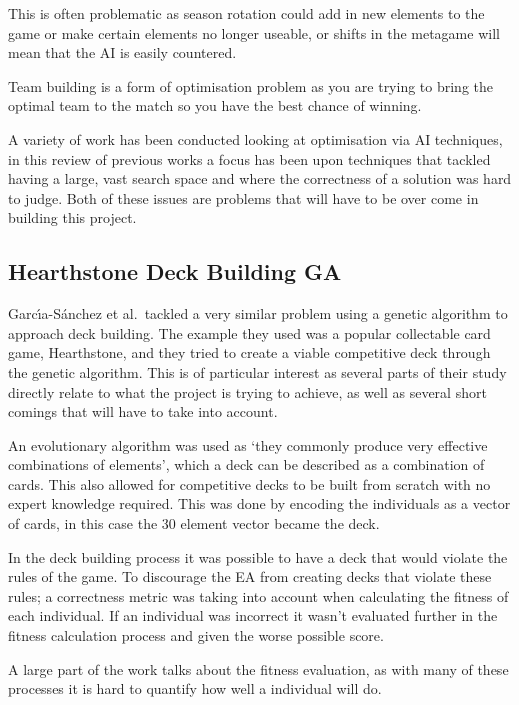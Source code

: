 \documentclass[a4paper]{article}
\begin{document}
This is often problematic as season rotation could add in new elements to the game or make certain elements no longer useable, or shifts in the metagame will mean that the AI is easily countered.
\par
Team building is a form of optimisation problem as you are trying to bring the optimal team to the match so you have the best chance of winning.
\par
A variety of work has been conducted looking at optimisation via AI techniques, in this review of previous works a focus has been upon techniques that tackled having a large, vast search space and where the correctness of a solution was hard to judge.
Both of these issues are problems that will have to be over come in building this project.
\subsection{Hearthstone Deck Building GA}
\par
Garc{\'\i}a-S{\'a}nchez et al.\ tackled a very similar problem using a genetic algorithm to approach deck building\cite{hearthstoneAI}.
The example they used was a popular collectable card game, Hearthstone, and they tried to create a viable competitive deck through the genetic algorithm.
This is of particular interest as several parts of their study directly relate to what the project is trying to achieve, as well as several short comings that will have to take into account.
\par
An evolutionary algorithm was used as `they commonly produce very effective combinations of elements'\cite{hearthstoneAI}, which a deck can be described as a combination of cards.
This also allowed for competitive decks to be built from scratch with no expert knowledge required.
This was done by encoding the individuals as a vector of cards, in this case the 30 element vector became the deck.
\par
In the deck building process it was possible to have a deck that would violate the rules of the game.
To discourage the EA from creating decks that violate these rules; a correctness metric was taking into account when calculating the fitness of each individual.
If an individual was incorrect it wasn't evaluated further in the fitness calculation process and given the worse possible score\cite{hearthstoneAI}.
\\ \par
A large part of the work talks about the fitness evaluation, as with many of these processes it is hard to quantify how well a individual will do.
\end{document}
